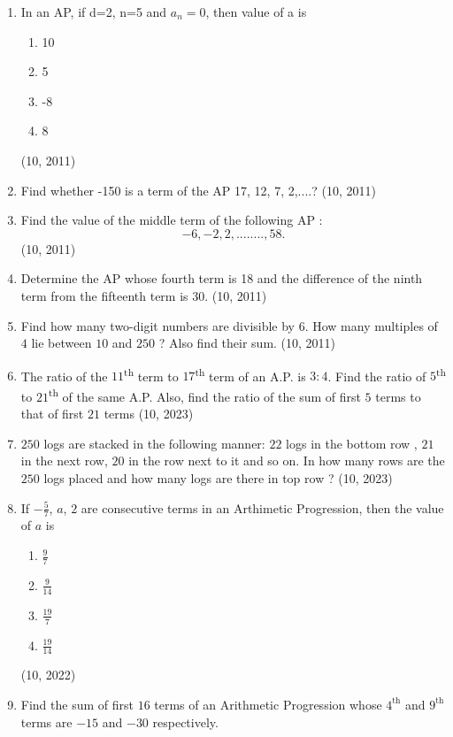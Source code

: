 \begin{enumerate}[label=\thesubsection.\arabic*,ref=\thesubsection.\theenumi,itemsep=1pt]
 \item In an AP, if d=2, n=5 and $a_n=0$, then value of a is
    \begin{enumerate}
         \item 10
         \item 5
         \item -8
         \item 8
    \end{enumerate}
    \hfill (10, 2011) \item Find whether -150 is a term of the AP 17, 12, 7, 2,....?
    \hfill (10, 2011) \item Find the value of the middle term of the following AP :\[- 6, -2, 2,........, 58.\]
   \hfill (10, 2011) \item Determine the AP whose fourth term is 18 and the difference of the ninth term from the fifteenth term is 30.
\hfill (10, 2011) \item Find how many two-digit numbers are divisible by $6$.
 How many multiples of $4$ lie between $10$ and $250$ ? Also find their sum.
    \hfill (10, 2011)
         \item The ratio of the $11$\textsuperscript{th} term to $17$\textsuperscript{th} term of an A.P. is $3:4$. Find the ratio of $5$\textsuperscript{th} to $21$\textsuperscript{th} of the same A.P. Also, find the ratio of the sum of first $5$ terms to that of first $21$ terms
        \hfill (10, 2023) \item $250$ logs are stacked in the following manner:
        $22$ logs in the bottom row , $21$ in the next row, $20$ in the row next to it and so on. In how many rows are the $250$ logs placed and how many logs are there in top row ?
\hfill (10, 2023)
 \item If $-\frac{5}{7}$, $a$, $2$ are consecutive terms in an Arthimetic Progression, then the value of $a$ is 
    \begin{enumerate}
\item $\frac{9}{7}$
 \item $\frac{9}{14}$
 \item $\frac{19}{7}$
 \item $\frac{19}{14}$
    \end{enumerate}
    \hfill (10, 2022) \item Find the sum of first $16$ terms of an Arithmetic Progression whose $4^{\text{th}}$ and $9^{\text{th}}$ terms are $-15$ and $-30$ respectively.
    

\end{enumerate}
